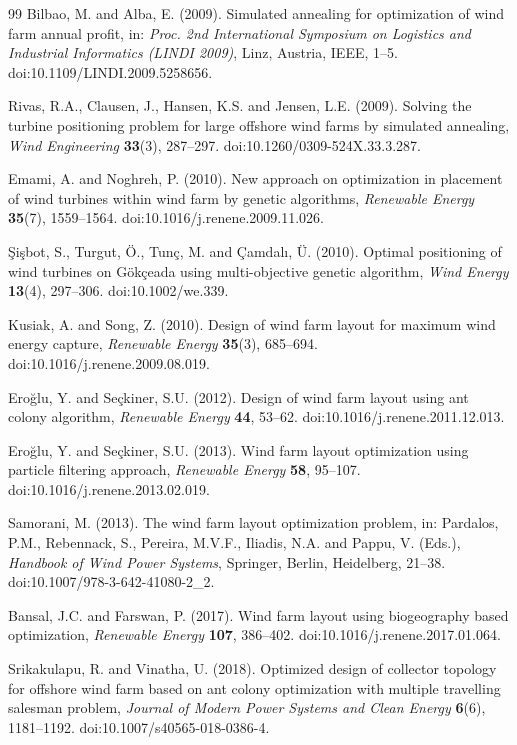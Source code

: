 \documentclass[journal,twoside]{IEEEtran}
\begin{document}
\begin{thebibliography}{99}
Bilbao, M. and Alba, E. (2009). Simulated annealing for optimization of wind farm annual profit, in: \textit{Proc. 2nd International Symposium on Logistics and Industrial Informatics (LINDI 2009)}, Linz, Austria, IEEE, 1--5. doi:10.1109/LINDI.2009.5258656.

Rivas, R.A., Clausen, J., Hansen, K.S. and Jensen, L.E. (2009). Solving the turbine positioning problem for large offshore wind farms by simulated annealing, \textit{Wind Engineering} \textbf{33}(3), 287--297. doi:10.1260/0309-524X.33.3.287.

Emami, A. and Noghreh, P. (2010). New approach on optimization in placement of wind turbines within wind farm by genetic algorithms, \textit{Renewable Energy} \textbf{35}(7), 1559--1564. doi:10.1016/j.renene.2009.11.026.

\c{S}i\c{s}bot, S., Turgut, \"O., Tun\c{c}, M. and \c{C}amdal\i, \"U. (2010). Optimal positioning of wind turbines on G\"ok\c{c}eada using multi-objective genetic algorithm, \textit{Wind Energy} \textbf{13}(4), 297--306. doi:10.1002/we.339.

Kusiak, A. and Song, Z. (2010). Design of wind farm layout for maximum wind energy capture, \textit{Renewable Energy} \textbf{35}(3), 685--694. doi:10.1016/j.renene.2009.08.019.

Ero\u{g}lu, Y. and Se\c{c}kiner, S.U. (2012). Design of wind farm layout using ant colony algorithm, \textit{Renewable Energy} \textbf{44}, 53--62. doi:10.1016/j.renene.2011.12.013.

Ero\u{g}lu, Y. and Se\c{c}kiner, S.U. (2013). Wind farm layout optimization using particle filtering approach, \textit{Renewable Energy} \textbf{58}, 95--107. doi:10.1016/j.renene.2013.02.019.

Samorani, M. (2013). The wind farm layout optimization problem, in: Pardalos, P.M., Rebennack, S., Pereira, M.V.F., Iliadis, N.A. and Pappu, V. (Eds.), \textit{Handbook of Wind Power Systems}, Springer, Berlin, Heidelberg, 21--38. doi:10.1007/978-3-642-41080-2\_2.

Bansal, J.C. and Farswan, P. (2017). Wind farm layout using biogeography based optimization, \textit{Renewable Energy} \textbf{107}, 386--402. doi:10.1016/j.renene.2017.01.064.

Srikakulapu, R. and Vinatha, U. (2018). Optimized design of collector topology for offshore wind farm based on ant colony optimization with multiple travelling salesman problem, \textit{Journal of Modern Power Systems and Clean Energy} \textbf{6}(6), 1181--1192. doi:10.1007/s40565-018-0386-4.


\end{thebibliography}
\end{document}

